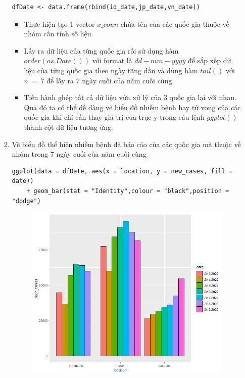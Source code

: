 \documentclass[a4paper]{article}
\theoremstyle{definition}
\begin{document}
\begin{enumerate}[i)]
\begin{enumerate}[1)]
\begin{lstlisting}[frame=single]
dfDate <- data.frame(rbind(id_date,jp_date,vn_date))
\end{lstlisting}
\begin{itemize}
    \item Thực hiện tạo 1 vector $x\_coun$ chứa tên của các quốc gia thuộc về nhóm cần tính số liệu.
    \item Lấy ra dữ liệu của từng quốc gia rồi sử dụng hàm $order(as.Date())$ với format là $dd-mm-yyyy$ để sắp xếp dữ liệu của từng quốc gia theo ngày tăng dần và dùng hàm $tail()$ với $n\ =\ 7$ để lấy ra 7 ngày cuối của năm cuối cùng.
    \item Tiến hành ghép tất cả dữ liệu vừa xử lý của 3 quốc gia lại với nhau. Qua đó ta có thể dễ dàng vẽ biểu đồ nhiễm bệnh hay tử vong của các quốc gia khi chỉ cần thay giá trị của trục y trong câu lệnh $ggplot()$ thành cột dữ liệu tương ứng.
\end{itemize}
\newpage
    \item Vẽ biểu đồ thể hiện nhiễm bệnh đã báo cáo của các quốc gia  mà thuộc về nhóm trong 7 ngày cuối của năm cuối cùng
    \lstset{
    title=Source code}
\begin{lstlisting}[frame=single]  
ggplot(data = dfDate, aes(x = location, y = new_cases, fill = date)) 
    + geom_bar(stat = "Identity",colour = "black",position = "dodge")
\end{lstlisting}
\begin{figure}[h!]
	\begin{center}
        \includegraphics[scale=0.8]{Images/IV/iv (3).png}
	\end{center}
\end{figure}



\end{enumerate}
\end{enumerate}
\end{document}

